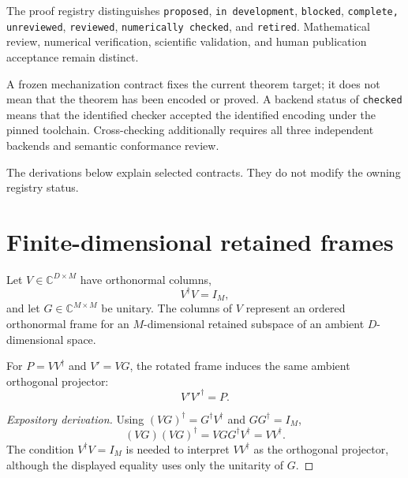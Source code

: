 The proof registry distinguishes \texttt{proposed}, \texttt{in development},
\texttt{blocked}, \texttt{complete, unreviewed}, \texttt{reviewed},
\texttt{numerically checked}, and \texttt{retired}. Mathematical review,
numerical verification, scientific validation, and human publication acceptance
remain distinct.

A frozen mechanization contract fixes the current theorem target; it does not
mean that the theorem has been encoded or proved. A backend status of
\texttt{checked} means that the identified checker accepted the identified
encoding under the pinned toolchain. Cross-checking additionally requires all
three independent backends and semantic conformance review.

The derivations below explain selected contracts. They do not modify the owning
registry status.

\section{Finite-dimensional retained frames}

Let $V\in\mathbb C^{D\times M}$ have orthonormal columns,
\begin{equation}
  V^{\dagger}V=I_M,
\end{equation}
and let $G\in\mathbb C^{M\times M}$ be unitary. The columns of $V$ represent an
ordered orthonormal frame for an $M$-dimensional retained subspace of an ambient
$D$-dimensional space.

\begin{proposition}
\label{prop:projector-invariance}
For $P=VV^{\dagger}$ and $V'=VG$, the rotated frame induces the same ambient
orthogonal projector:
\begin{equation}
  V'V'^{\dagger}=P.
\end{equation}
\end{proposition}

\begin{proof}[Expository derivation]
Using $(VG)^{\dagger}=G^{\dagger}V^{\dagger}$ and
$GG^{\dagger}=I_M$,
\begin{equation}
  (VG)(VG)^{\dagger}
  =VGG^{\dagger}V^{\dagger}
  =VV^{\dagger}.
\end{equation}
The condition $V^{\dagger}V=I_M$ is needed to interpret $VV^{\dagger}$ as the
orthogonal projector, although the displayed equality uses only the unitarity
of $G$.
\end{proof}


